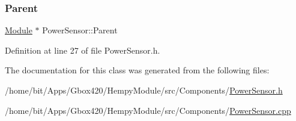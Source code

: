 \subsubsection{\texorpdfstring{Parent}{Parent}}
{\footnotesize\ttfamily \hyperlink{class_module}{Module} $\ast$ Power\+Sensor\+::\+Parent\hspace{0.3cm}{\ttfamily [protected]}}



Definition at line 27 of file Power\+Sensor.\+h.



The documentation for this class was generated from the following files\+:\begin{DoxyCompactItemize}
\item 
/home/bit/\+Apps/\+Gbox420/\+Hempy\+Module/src/\+Components/\hyperlink{_hempy_module_2src_2_components_2_power_sensor_8h}{Power\+Sensor.\+h}\item 
/home/bit/\+Apps/\+Gbox420/\+Hempy\+Module/src/\+Components/\hyperlink{_hempy_module_2src_2_components_2_power_sensor_8cpp}{Power\+Sensor.\+cpp}\end{DoxyCompactItemize}
